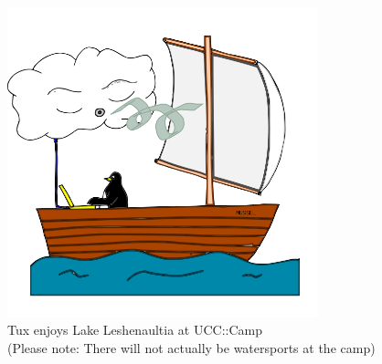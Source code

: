 \begin{figure}[H]
	\centering
	\includegraphics[width=0.8\textwidth]{figures/tux_boat.png}
	\caption{Tux enjoys Lake Leshenaultia at UCC::Camp \\ (Please note: There will not actually be watersports at the camp)}
	\label{tux_boat.png}
\end{figure}

